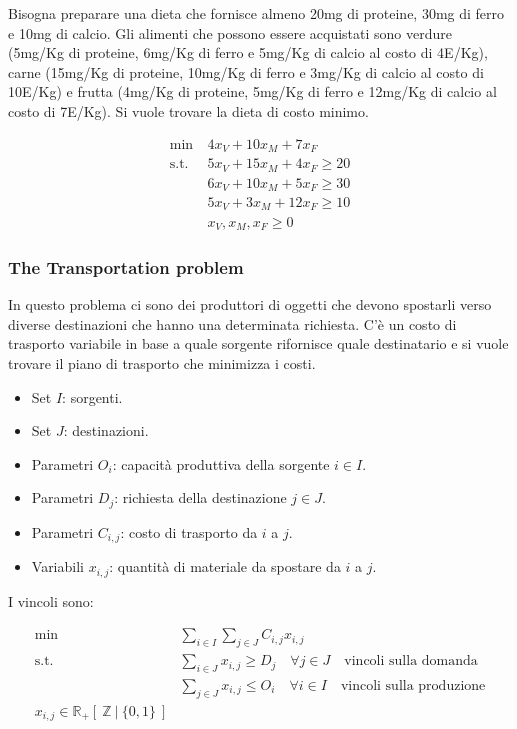 Bisogna preparare una dieta che fornisce almeno 20mg di proteine, 30mg di ferro e 10mg di calcio. Gli alimenti che possono essere acquistati sono verdure (5mg/Kg di proteine, 6mg/Kg di ferro e 5mg/Kg di calcio al costo di 4E/Kg), carne (15mg/Kg di proteine, 10mg/Kg di ferro e 3mg/Kg di calcio al costo di 10E/Kg) e frutta (4mg/Kg di proteine, 5mg/Kg di ferro e 12mg/Kg di calcio al costo di 7E/Kg). Si vuole trovare la dieta di costo minimo.

\begin{align*}
\min \: & 4x_V + 10 x_M + 7 x_F \\
\text{s.t. } & 5x_V + 15x_M + 4x_F \geq 20 \\
&6x_V + 10 x_M + 5 x_F \geq 30 \\
&5x_V + 3x_M +12x_F \geq 10 \\
&x_V, x_M, x_F \geq 0
\end{align*}

\subsubsection{The Transportation problem}

In questo problema ci sono dei produttori di oggetti che devono spostarli verso diverse destinazioni che hanno una determinata richiesta. C'è un costo di trasporto variabile in base a quale sorgente rifornisce quale destinatario e si vuole trovare il piano di trasporto che minimizza i costi.

\begin{itemize}
	\item Set $I$: sorgenti.
	\item Set $J$: destinazioni.
	\item Parametri $O_i$: capacità produttiva della sorgente $i \in I$.
	\item Parametri $D_j$: richiesta della destinazione $j \in J$.
	\item Parametri $C_{i,j}$: costo di trasporto da $i$ a $j$.
	\item Variabili $x_{i,j}$: quantità di materiale da spostare da $i$ a $j$.
\end{itemize}

I vincoli sono:

\begin{align*}
	\min \: & \sum\limits_{i \in I} \sum\limits_{j \in J} C_{i,j} x_{i,j} \\
	\text{s.t. }& \sum\limits_{i \in J} x_{i,j} \geq D_j \quad \forall j \in J \quad \text{vincoli sulla domanda} \\
	& \sum\limits_{j \in J} x_{i,j} \leq O_i \quad \forall i \in I \quad \text{vincoli sulla produzione} \\
	x_{i,j} \in \mathbb{R}_+ [\:\mathbb{Z} \:|\: \{0,1\} \:]
\end{align*}

